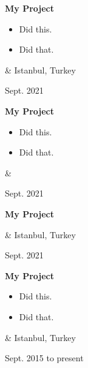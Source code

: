 \documentclass[10pt, letterpaper]{article}
\newenvironment{highlights}{
        \begin{itemize}[
                topsep=0pt,
                parsep=0.10 cm,
                partopsep=0pt,
                itemsep=0pt,
                after=\vspace{-1\baselineskip},
                leftmargin=0.4 cm + 3pt
            ]
    }{
        \end{itemize}
    } %
\let\originalTabularx\tabularx
\let\originalEndTabularx\endtabularx
\renewenvironment{tabularx}{\bgroup\centering\originalTabularx}{\originalEndTabularx\par\egroup}
\begin{document}
        \vspace{0.2 cm}
        \begin{tabularx}{
            \textwidth-0.4 cm-0.13cm
        }{
            K{0.2 cm}
            R{4.1 cm}
        }
            \textbf{My Project}

            \vspace{0.10 cm}

            \begin{highlights}
                \item Did this.
                \item Did that.
            \end{highlights}
            &
            Istanbul, Turkey

            Sept. 2021
        \end{tabularx}


        \vspace{0.2 cm}
        \begin{tabularx}{
            \textwidth-0.4 cm-0.13cm
        }{
            K{0.2 cm}
            R{4.1 cm}
        }
            \textbf{My Project}

            \vspace{0.10 cm}

            \begin{highlights}
                \item Did this.
                \item Did that.
            \end{highlights}
            &
            

            Sept. 2021
        \end{tabularx}


        \vspace{0.2 cm}
        \begin{tabularx}{
            \textwidth-0.4 cm-0.13cm
        }{
            K{0.2 cm}
            R{4.1 cm}
        }
            \textbf{My Project}

            \vspace{0.10 cm}

            &
            Istanbul, Turkey

            Sept. 2021
        \end{tabularx}


        \vspace{0.2 cm}
        \begin{tabularx}{
            \textwidth-0.4 cm-0.13cm
        }{
            K{0.2 cm}
            R{4.1 cm}
        }
            \textbf{My Project}

            \vspace{0.10 cm}

            \begin{highlights}
                \item Did this.
                \item Did that.
            \end{highlights}
            &
            Istanbul, Turkey

            Sept. 2015 to present
        \end{tabularx}
\end{document}
